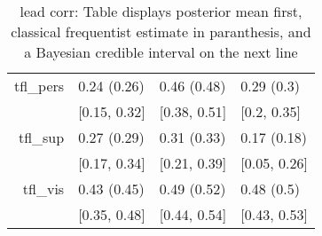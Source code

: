 \begin{table}[ht]
\begin{tabular}{rlll}
  tfl\_pers & 0.24 (0.26) & 0.46 (0.48) & 0.29 (0.3) \\ 
                           & [0.15, 0.32] & [0.38, 0.51] & [0.2, 0.35] \\ 
  tfl\_sup & 0.27 (0.29) & 0.31 (0.33) & 0.17 (0.18) \\ 
                             & [0.17, 0.34] & [0.21, 0.39] & [0.05, 0.26] \\ 
  tfl\_vis & 0.43 (0.45) & 0.49 (0.52) & 0.48 (0.5) \\ 
                               & [0.35, 0.48] & [0.44, 0.54] & [0.43, 0.53] \\ 
   \hline
\end{tabular}
\caption{lead corr: Table displays posterior mean first, classical frequentist estimate in paranthesis, and a Bayesian credible interval on the next line} 
\label{lead_corr}
\end{table}
